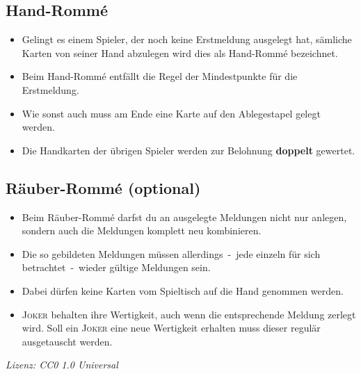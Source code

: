 \documentclass[a4paper,12pt,twoside]{article}
\begin{document}
\subsection*{Hand-Rommé}

\begin{itemize}
    \item Gelingt es einem Spieler, der noch keine Erstmeldung ausgelegt hat, sämliche Karten von seiner Hand abzulegen wird dies als Hand-Rommé bezeichnet.
    \item Beim Hand-Rommé entfällt die Regel der Mindestpunkte für die Erstmeldung.
    \item Wie sonst auch muss am Ende eine Karte auf den Ablegestapel gelegt werden.
    \item Die Handkarten der übrigen Spieler werden zur Belohnung \textbf{doppelt} gewertet.
\end{itemize}


\subsection*{Räuber-Rommé (optional)}

\begin{itemize}
    \item Beim Räuber-Rommé darfst du an ausgelegte Meldungen nicht nur anlegen, sondern auch die Meldungen komplett neu kombinieren.
    \item Die so gebildeten Meldungen müssen allerdings~-~jede einzeln für sich betrachtet~-~wieder gültige Meldungen sein.
    \item Dabei dürfen keine Karten vom Spieltisch auf die Hand genommen werden.
    \item \textsc{Joker} behalten ihre Wertigkeit, auch wenn die entsprechende Meldung zerlegt wird. Soll ein \textsc{Joker} eine neue Wertigkeit erhalten muss dieser regulär ausgetauscht werden.
\end{itemize}


\vfill
\small\textit{Lizenz: CC0 1.0 Universal}
\end{document}

